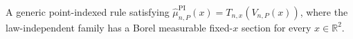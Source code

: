 A generic point-indexed rule satisfying \(\widehat\mu_{n,P}^{\mathrm{PI}}(x)=T_{n,x}(V_{n,P}(x))\), where the law-independent family has a Borel measurable fixed-\(x\) section for every \(x\in\mathbb R^2\).